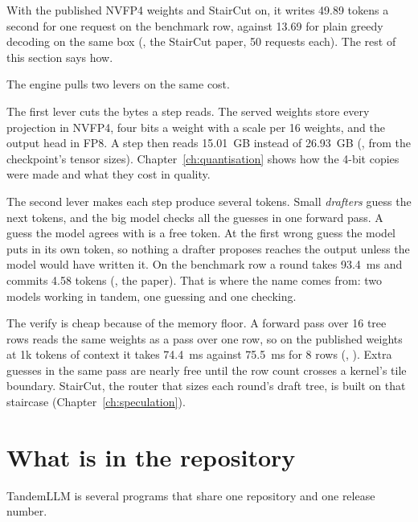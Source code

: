 With the published NVFP4 weights and StairCut on, it writes 49.89 tokens a second for one request on the benchmark row, against 13.69 for plain greedy decoding on the same box (\measured, the StairCut paper, 50 requests each). The rest of this section says how.

The engine pulls two levers on the same cost.

The first lever cuts the bytes a step reads. The served weights store every projection in NVFP4, four bits a weight with a scale per 16 weights, and the output head in FP8. A step then reads 15.01~GB instead of 26.93~GB (\arith, from the checkpoint's tensor sizes). Chapter~\ref{ch:quantisation} shows how the 4-bit copies were made and what they cost in quality.

The second lever makes each step produce several tokens. Small \emph{drafters} guess the next tokens, and the big model checks all the guesses in one forward pass. A guess the model agrees with is a free token. At the first wrong guess the model puts in its own token, so nothing a drafter proposes reaches the output unless the model would have written it. On the benchmark row a round takes 93.4~ms and commits 4.58 tokens (\measured, the paper). That is where the name comes from: two models working in tandem, one guessing and one checking.

The verify is cheap because of the memory floor. A forward pass over 16 tree rows reads the same weights as a pass over one row, so on the published weights at 1k tokens of context it takes 74.4~ms against 75.5~ms for 8 rows (\measured, ). Extra guesses in the same pass are nearly free until the row count crosses a kernel's tile boundary. StairCut, the router that sizes each round's draft tree, is built on that staircase (Chapter~\ref{ch:speculation}).

\section{What is in the repository}

TandemLLM is several programs that share one repository and one release number.

